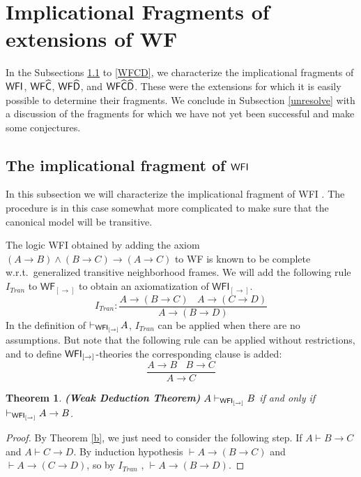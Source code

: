 \documentclass[12pt]{article}
\newtheorem{thm}{Theorem}[section]
\newtheorem{dfn}[thm]{Definition}
\begin{document}
\section{Implicational Fragments of extensions of {\sf WF}}\label{extwf}
In the Subsections \ref{WFI} to \ref{WFCD}, we characterize the implicational fragments of ${\sf WFI}$, ${\sf WF}\widehat{{\sf C}}$, ${\sf WF}\widehat{{\sf D}}$, and ${\sf WF}\widehat{{\sf C}} \widehat{{\sf D}}$. These were the extensions for which it is easily possible to determine their fragments. 
We conclude in Subsection \ref{unresolve} with a discussion of the fragments for which we have not yet been successful and make some conjectures.

\subsection{The implicational fragment of ${\sf WFI } $}\label{WFI}
In this subsection we will characterize the implicational fragment of {\sf WFI }. The procedure is in this case somewhat more complicated to make sure that the canonical model will be transitive.


The logic {\sf WFI } obtained by adding the axiom $(A\rightarrow B)\wedge (B\rightarrow C)\rightarrow (A\rightarrow C) $ to {\sf WF} is known to be complete w.r.t.\ generalized transitive neighborhood frames. We will add the following rule $ I_{Tran} $ to $\mathsf{WF_{[\rightarrow]}}$  to obtain an axiomatization of ${\mathsf{WFI_{[\rightarrow]}}}$.
$$ I_{Tran}:   \frac{A\rightarrow (B\rightarrow C)~~~~A\rightarrow (C\rightarrow D)}{A\rightarrow (B\rightarrow D)}$$ 
In the definition of $ \vdash_{{\sf WFI_{[\rightarrow]}} }\! A $, $ I_{Tran} $ can be applied when there are no assumptions. But note that the following rule can be applied without restrictions, and to define ${\sf WFI_{[\rightarrow]}}$-theories the corresponding clause is added:
$$ \dfrac{A\rightarrow B~~~~B\rightarrow C}{A\rightarrow C} $$
\begin{thm}
\textbf{(Weak Deduction Theorem)} $A\vdash_{{\sf WFI_{[\rightarrow]}} } B  $ if and only if $ \vdash_{{\sf WFI_{[\rightarrow]}} } A\rightarrow B $.
\end{thm}
\begin{proof} By Theorem \ref{b}, we just need to consider the following step. 
If $ A\vdash B\rightarrow C   $ and  $A\vdash C\rightarrow D $. By induction hypothesis $ \vdash A\rightarrow (B\rightarrow C) $ and $ \vdash A\rightarrow (C\rightarrow D) $, so by $ I_{Tran} $ , $ \vdash A\rightarrow (B\rightarrow D)$.
\end{proof}
\end{document}

